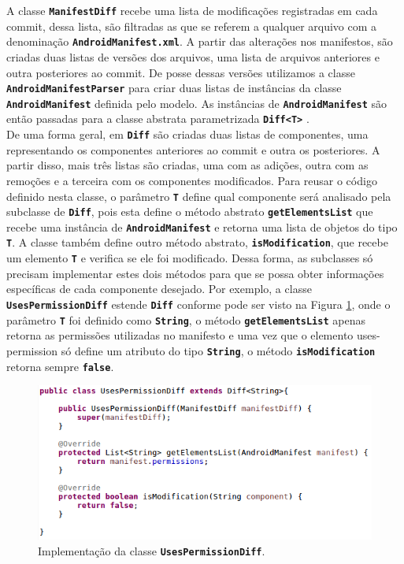 \documentclass[a4paper,12pt]{article}
\begin{document}
A classe {\small\texttt{\textbf{ManifestDiff}}} recebe uma lista de modificações registradas em cada commit, dessa lista, são filtradas as que se referem a qualquer arquivo com a denominação {\small\texttt{\textbf{AndroidManifest.xml}}}. A partir das alterações  nos manifestos, são criadas duas listas de versões dos arquivos, uma lista de arquivos anteriores e outra posteriores ao commit. De posse dessas versões utilizamos a classe {\small\texttt{\textbf{AndroidManifestParser}}} para criar duas listas de instâncias da classe {\small\texttt{\textbf{AndroidManifest}}} definida pelo modelo. As instâncias de {\small\texttt{\textbf{AndroidManifest}}} são então passadas para a classe abstrata parametrizada {\small\texttt{\textbf{Diff<T>}}} . \\


De uma forma geral, em {\small\texttt{\textbf{Diff}}} são criadas duas listas de componentes, uma representando os componentes anteriores ao commit e outra os posteriores. A partir disso, mais três listas são criadas, uma com as adições, outra com as remoções e a terceira com os componentes modificados. Para reusar o código definido nesta classe, o parâmetro {\small\texttt{\textbf{T}}} define qual componente será analisado pela subclasse de {\small\texttt{\textbf{Diff}}}, pois esta define o método abstrato {\small\texttt{\textbf{getElementsList}}} que recebe uma instância de {\small\texttt{\textbf{AndroidManifest}}} e retorna uma lista de objetos do tipo {\small\texttt{\textbf{T}}}. A classe também define outro método abstrato, {\small\texttt{\textbf{isModification}}}, que recebe um elemento {\small\texttt{\textbf{T}}} e verifica se ele foi modificado. Dessa forma, as subclasses só precisam implementar estes dois métodos para que se possa obter informações específicas de cada componente desejado. Por exemplo, a classe {\small\texttt{\textbf{UsesPermissionDiff}}} estende {\small\texttt{\textbf{Diff}}} conforme pode ser visto na Figura \ref{fig:usesdiff}, onde o parâmetro {\small\texttt{\textbf{T}}} foi definido como {\small\texttt{\textbf{String}}}, o método {\small\texttt{\textbf{getElementsList}}} apenas retorna as permissões utilizadas no manifesto e uma vez que o elemento uses-permission só define um atributo do tipo {\small\texttt{\textbf{String}}}, o método {\small\texttt{\textbf{isModification}}} retorna sempre {\small\texttt{\textbf{false}}}.
\\ 


\begin{figure}[h]
\centering
\includegraphics[width=0.8\linewidth]{imgs/usesdiff.png}
\caption{Implementação da classe {\small\texttt{\textbf{UsesPermissionDiff}}}.}
\label{fig:usesdiff}
\end{figure}
\end{document}
